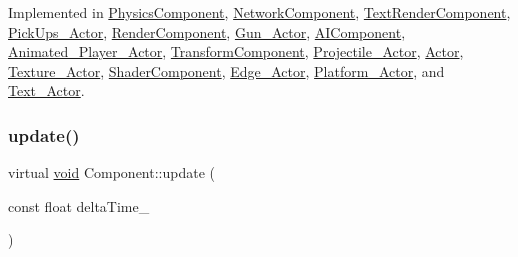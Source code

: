 Implemented in \hyperlink{classPhysicsComponent_a7494b2fec675132ee3e31050d7d87d30}{Physics\+Component}, \hyperlink{classNetworkComponent_ae731efcb319689aa9848ad8631ddfffc}{Network\+Component}, \hyperlink{classTextRenderComponent_a73c53ed27b94597551536fda5775fb49}{Text\+Render\+Component}, \hyperlink{classPickUps__Actor_a3f098ecced007eaa97719faaf7ba35d4}{Pick\+Ups\+\_\+\+Actor}, \hyperlink{classRenderComponent_a93203c887b05a024f70f30e8a71576bd}{Render\+Component}, \hyperlink{classGun__Actor_ab5e7b6b7032e1f0353c6c4f08cedebec}{Gun\+\_\+\+Actor}, \hyperlink{classAIComponent_a456939f85de6d6cfc3e4e48ffc9f568c}{A\+I\+Component}, \hyperlink{classAnimated__Player__Actor_aa383063c812e8b0015f18485ab000d65}{Animated\+\_\+\+Player\+\_\+\+Actor}, \hyperlink{classTransformComponent_a0cd568e49687464927c79ac7ab03f004}{Transform\+Component}, \hyperlink{classProjectile__Actor_ab61aec7117a93626c3096bef71ab30fc}{Projectile\+\_\+\+Actor}, \hyperlink{classActor_a724ff8f2e9c34f15a6c443a3912504c4}{Actor}, \hyperlink{classTexture__Actor_afe03163ea0bff0ea0fa3c3fb6c560c79}{Texture\+\_\+\+Actor}, \hyperlink{classShaderComponent_ab8f4b5e17bf77b20e509ac94c9dddc10}{Shader\+Component}, \hyperlink{classEdge__Actor_a8ae8a19c72b58522755d2d0a395fc1ea}{Edge\+\_\+\+Actor}, \hyperlink{classPlatform__Actor_a12b22d88efc384ac35060d04fbbe710d}{Platform\+\_\+\+Actor}, and \hyperlink{classText__Actor_a26181e1102ab2a37ec8b140c999a6f6a}{Text\+\_\+\+Actor}.

\mbox{\label{classComponent_a3448977e6f464df89e77dda7c6f52204}} 
\subsubsection{\texorpdfstring{update()}{update()}\hspace{0.1cm}{\footnotesize\ttfamily [2/2]}}
{\footnotesize\ttfamily virtual \hyperlink{imgui__impl__opengl3__loader_8h_ac668e7cffd9e2e9cfee428b9b2f34fa7}{void} Component\+::update (\begin{DoxyParamCaption}\item[{const float}]{delta\+Time\+\_\+ }\end{DoxyParamCaption})\hspace{0.3cm}{\ttfamily [pure virtual]}}



